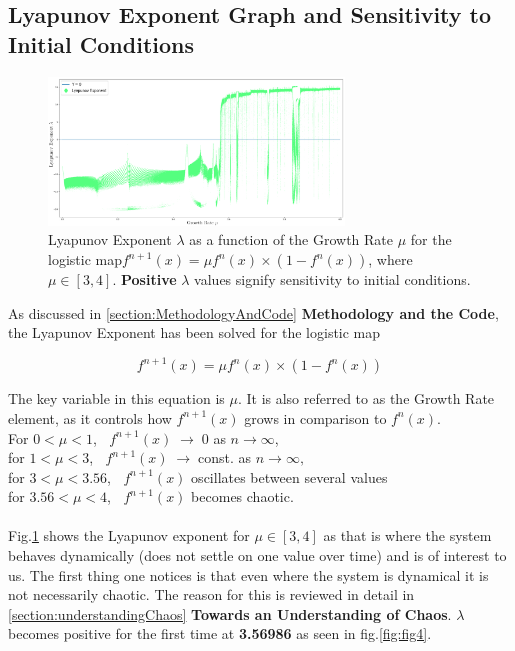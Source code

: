 \newpage
\subsection{Lyapunov Exponent Graph and Sensitivity to Initial Conditions}

\begin{figure}[h]
    \centering
    \includegraphics[width=0.7\textwidth]{Images/Lyapunov 3.1.png}
    \caption{Lyapunov Exponent $\lambda$ as a function of the Growth Rate $\mu$ 
    for the logistic map$f^{n+1}(x)=\mu f^n(x) \times (1-f^n(x))$, 
    where $\mu \in [3,4]$. \textbf{Positive} $\lambda$ values signify
    sensitivity to initial conditions.}
    \label{fig:fig3}
\end{figure}

As discussed in \ref{section:MethodologyAndCode} \textbf{Methodology and the Code},
the Lyapunov Exponent has been solved for the logistic map 

\begin{equation}
    \label{eq:2.6}
    f^{n+1}(x)=\mu f^n(x) \times (1-f^n(x))
\end{equation}

The key variable in this equation is $\mu$. It is also referred to as the Growth Rate element,
as it controls how $f^{n+1}(x)$ grows in comparison to $f^n(x)$.\\
For $0<\mu<1$, $\; \;f^{n+1}(x)\;\to\;0$ as $n\to \infty$,\\
for $1<\mu<3$, $\; \;f^{n+1}(x)\;\to\;$const. as $n\to \infty,$\\
for $3<\mu<3.56$, $\; \;f^{n+1}(x)$ oscillates between several values\\
for $3.56<\mu<4$, $\; \;f^{n+1}(x)$ becomes chaotic.
\paragraph{}
Fig.\ref{fig:fig3} shows the Lyapunov exponent for $\mu \in [3,4]$ as that is
where the system behaves dynamically (does not settle on one value over time) 
and is of interest to us. The first thing one notices is that even where the 
system is dynamical it is not necessarily chaotic. The reason for this is
reviewed in detail in \ref{section:understandingChaos} \textbf{Towards an 
Understanding of Chaos}. $\lambda$ becomes positive for the first time at
\textbf{3.56986} as seen in fig.\ref{fig:fig4}.

